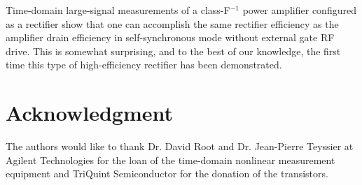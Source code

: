 Time-domain large-signal measurements of a class-F$^{-1}$ power amplifier configured as a rectifier show that one can accomplish the same rectifier efficiency as the amplifier drain efficiency in self-synchronous mode without external gate RF drive. This is somewhat surprising, and to the best of our knowledge, the first time this type of high-efficiency rectifier has been demonstrated.



\section*{Acknowledgment}


The authors would like to thank Dr. David Root and Dr. Jean-Pierre Teyssier at Agilent Technologies for the loan of the time-domain nonlinear measurement equipment and TriQuint Semiconductor for the donation of the transistors. 




%


